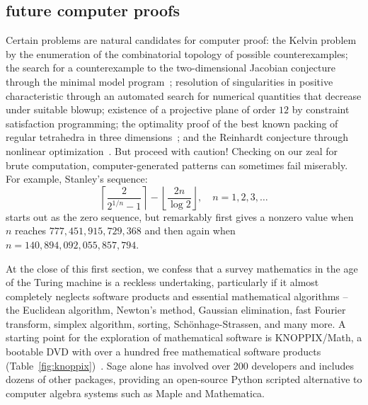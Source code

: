 \documentclass{llncs}
\begin{document}
\subsection{future computer proofs}

Certain problems are natural candidates for computer proof: the Kelvin
problem by the enumeration of the combinatorial topology of possible
counterexamples; the search for a counterexample to the
two-dimensional Jacobian conjecture through the minimal model
program~\cite{Borisov}; resolution of singularities in positive
characteristic through an automated search for numerical quantities
that decrease under suitable blowup; existence of a projective plane
of order $12$ by constraint satisfaction programming; the optimality
proof of the best known packing of regular tetrahedra in three
dimensions~\cite{Chen-2010}; and the Reinhardt conjecture through
nonlinear optimization~\cite{HR11}.  But proceed with caution!
Checking on our zeal for brute computation, computer-generated
patterns can sometimes fail miserably.  For example, Stanley's
sequence:
\[
\left\lceil{\frac{2}{2^{1/n} - 1}}\right\rceil- 
\left\lfloor{\frac{2 n}{\log 2}}\right\rfloor,\quad n=1,2,3,\ldots
\]
starts out as the zero sequence, but remarkably first gives a nonzero
value when $n$ reaches $777,451,915,729,368$ and then again when
$n=140,894,092,055,857,794$.





\smallskip At the close of this first section, we confess that a
survey mathematics in the age of the Turing machine is a reckless
undertaking, particularly if it almost completely neglects software
products and essential mathematical algorithms -- the Euclidean
algorithm, Newton's method, Gaussian elimination, fast Fourier
transform, simplex algorithm, sorting, Sch\"onhage-Strassen, and many
more.  A starting point for the exploration of mathematical software
is KNOPPIX/Math, a bootable DVD with over a hundred free mathematical
software products (Table~\ref{fig:knoppix})~\cite{HK08}.  Sage alone
has involved over 200 developers and includes dozens of other
packages, providing an open-source Python scripted alternative to
computer algebra systems such as Maple and Mathematica.
\end{document}

